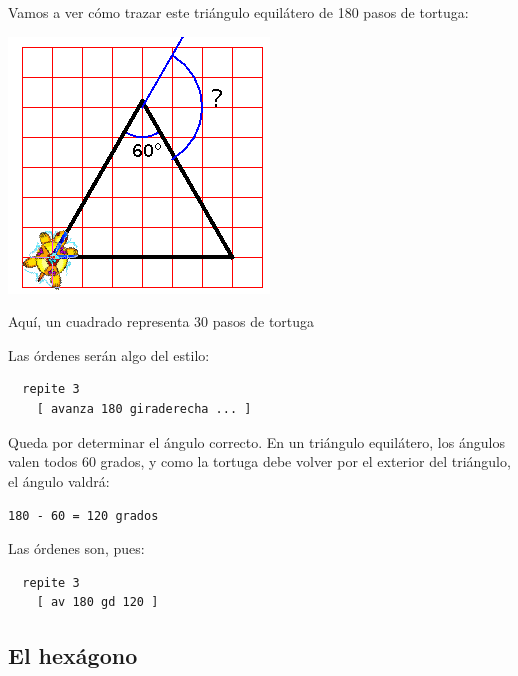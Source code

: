 \documentclass[12pt,twoside,spanish,a4paper]{report}
\begin{document}
% 
Vamos a ver c\'omo trazar este tri\'angulo equil\'atero de 180 pasos de
tortuga:
\begin{center}
   \includegraphics[scale=0.5]{Imagenes_Tutorial/02_Triangulo.png}

   Aqu\'i, un cuadrado representa 30 pasos de tortuga
\end{center}

\noindent Las \'ordenes ser\'an algo del estilo:
\begin{verbatim}
  repite 3
    [ avanza 180 giraderecha ... ] \end{verbatim}
Queda por determinar el \'angulo correcto. En un tri\'angulo equil\'atero,
los \'angulos valen todos 60 grados, y como la tortuga debe volver por el
exterior del tri\'angulo, el \'angulo valdr\'a:
\begin{center}
  \texttt{180 - 60 = 120 grados}
\end{center}
Las \'ordenes son, pues:
\begin{verbatim}
  repite 3
    [ av 180 gd 120 ] \end{verbatim}

\subsection{El hex\'agono}
    \label{sub:El-hexagono}
\end{document}
